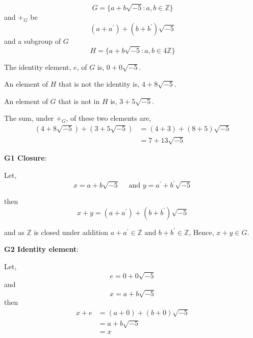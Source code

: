 \documentclass{tufte-handout}
\begin{document}
\begin{question}

\[ G = \{ a + b\sqrt{-5} : a,b \in \mathbb{Z} \} \]
and \( \boldsymbol{+}_{G} \) be
\[ (a + a^\prime) + (b + b^\prime)\sqrt{-5} \]
and a subgroup of \( G \)
\[ H = \{ a + b\sqrt{-5} : a,b \in 4\mathbb{Z} \} \]

\vspace{1cm}

\qpart

\qsubpart

The identity element, \( e \), of \( G \) is, \( 0 + 0\sqrt{-5} \).

\qsubpart

An element of \( H \) that is not the identity is, \( 4 + 8\sqrt{-5} \).

\qsubpart

An element of \( G \) that is not in \( H \) is, \( 3 + 5\sqrt{-5} \).

\qsubpart

The sum, under \( \boldsymbol{+}_{G} \), of these two elements are,
\begin{align*}
(4 + 8\sqrt{-5}) + (3 + 5\sqrt{-5}) &= (4 + 3) + (8 + 5)\sqrt{-5}\\
&= 7 + 13\sqrt{-5}
\end{align*}

\vspace{3cm}

\qpart

\textbf{G1 Closure}:

Let,
\[ x = a + b\sqrt{-5} \quad \text{ and } y = a^\prime + b^\prime\sqrt{-5} \]

then
\[ x + y = (a + a^\prime) + (b + b^\prime)\sqrt{-5} \]

and as \( \mathbb{Z} \) is closed under addition \( a + a^\prime \in \mathbb{Z} \text{ and } b + b^\prime \in \mathbb{Z}\),
Hence, \( x + y \in G \).

\vspace{2cm}

\textbf{G2 Identity element}:

Let,
\[ e = 0 + 0\sqrt{-5} \]
and
\[ x = a + b\sqrt{-5} \]
then
\begin{align*}
x + e &= (a + 0) + (b + 0)\sqrt{-5}\\
&= a + b\sqrt{-5}\\
&= x
\end{align*}

\vspace{2cm}


\end{question}
\end{document}
